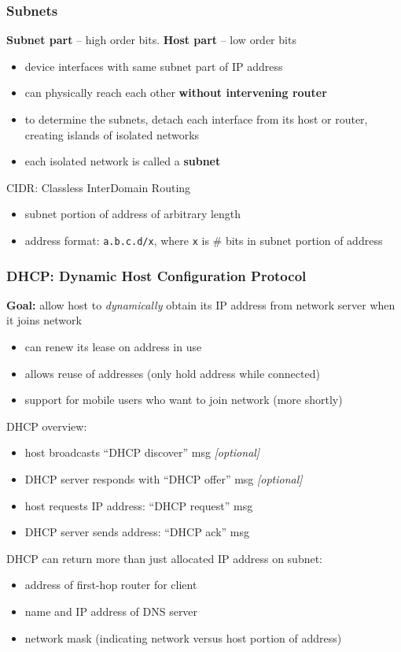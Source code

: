 \subsubsection{Subnets}
\textbf{Subnet part} -- high order bits. \textbf{Host part} -- low order bits
\begin{itemize}
	\item device interfaces with same subnet part of IP address
	\item can physically reach each other \textbf{without intervening router}
	\item to determine the subnets, detach each interface from its host or router, creating islands of isolated networks
	\item each isolated network is called a \textbf{subnet}
\end{itemize}
CIDR: Classless InterDomain Routing
\begin{itemize}
	\item subnet portion of address of arbitrary length
	\item address format: \texttt{a.b.c.d/x}, where \texttt{x} is \# bits in subnet portion of address
\end{itemize}
\subsubsection{DHCP: Dynamic Host Configuration Protocol}\label{sec:dhcp}
\begin{leftbar}
	\textbf{Goal:} allow host to \textit{dynamically} obtain its IP address from network server when it joins network
\end{leftbar}
\begin{itemize}
	\item can renew its lease on address in use
	\item allows reuse of addresses (only hold address while connected)
	\item support for mobile users who want to join network (more shortly)
\end{itemize}
DHCP overview:
\begin{itemize}
	\item host broadcasts ``DHCP discover'' msg \textit{[optional]}
	\item DHCP server responds with ``DHCP offer'' msg \textit{[optional]}
	\item host requests IP address: ``DHCP request'' msg
	\item DHCP server sends address: ``DHCP ack'' msg
\end{itemize}
DHCP can return more than just allocated IP address on subnet:
\begin{itemize}
	\item address of first-hop router for client
	\item name and IP address of DNS server
	\item network mask (indicating network versus host portion of address)
\end{itemize}
